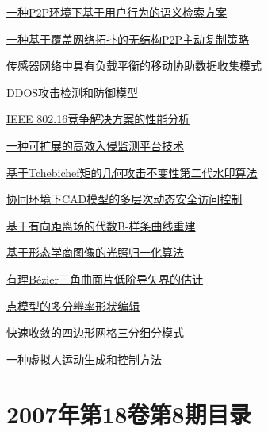 \documentclass[a4paper]{article}
\begin{document}
\href{http://www.jos.org.cn/ch/reader/download_pdf.aspx?file_no=20070916&year_id=2007&quarter_id=9&falg=1}{一种P2P环境下基于用户行为的语义检索方案}

\href{http://www.jos.org.cn/ch/reader/download_pdf.aspx?file_no=20070917&year_id=2007&quarter_id=9&falg=1}{一种基于覆盖网络拓扑的无结构P2P主动复制策略}

\href{http://www.jos.org.cn/ch/reader/download_pdf.aspx?file_no=20070918&year_id=2007&quarter_id=9&falg=1}{传感器网络中具有负载平衡的移动协助数据收集模式}

\href{http://www.jos.org.cn/ch/reader/download_pdf.aspx?file_no=20070919&year_id=2007&quarter_id=9&falg=1}{DDOS攻击检测和防御模型}

\href{http://www.jos.org.cn/ch/reader/download_pdf.aspx?file_no=20070920&year_id=2007&quarter_id=9&falg=1}{IEEE 802.16竞争解决方案的性能分析}

\href{http://www.jos.org.cn/ch/reader/download_pdf.aspx?file_no=20070921&year_id=2007&quarter_id=9&falg=1}{一种可扩展的高效入侵监测平台技术}

\href{http://www.jos.org.cn/ch/reader/download_pdf.aspx?file_no=20070922&year_id=2007&quarter_id=9&falg=1}{基于Tchebichef矩的几何攻击不变性第二代水印算法}

\href{http://www.jos.org.cn/ch/reader/download_pdf.aspx?file_no=20070923&year_id=2007&quarter_id=9&falg=1}{协同环境下CAD模型的多层次动态安全访问控制}

\href{http://www.jos.org.cn/ch/reader/download_pdf.aspx?file_no=20070924&year_id=2007&quarter_id=9&falg=1}{基于有向距离场的代数B-样条曲线重建}

\href{http://www.jos.org.cn/ch/reader/download_pdf.aspx?file_no=20070925&year_id=2007&quarter_id=9&falg=1}{基于形态学商图像的光照归一化算法}

\href{http://www.jos.org.cn/ch/reader/download_pdf.aspx?file_no=20070926&year_id=2007&quarter_id=9&falg=1}{有理Bézier三角曲面片低阶导矢界的估计}

\href{http://www.jos.org.cn/ch/reader/download_pdf.aspx?file_no=20070927&year_id=2007&quarter_id=9&falg=1}{点模型的多分辨率形状编辑}

\href{http://www.jos.org.cn/ch/reader/download_pdf.aspx?file_no=20070928&year_id=2007&quarter_id=9&falg=1}{快速收敛的四边形网格三分细分模式}

\href{http://www.jos.org.cn/ch/reader/download_pdf.aspx?file_no=20070929&year_id=2007&quarter_id=9&falg=1}{一种虚拟人运动生成和控制方法}


\section{\textbf{2007年第18卷第8期目录}}
\end{document}
